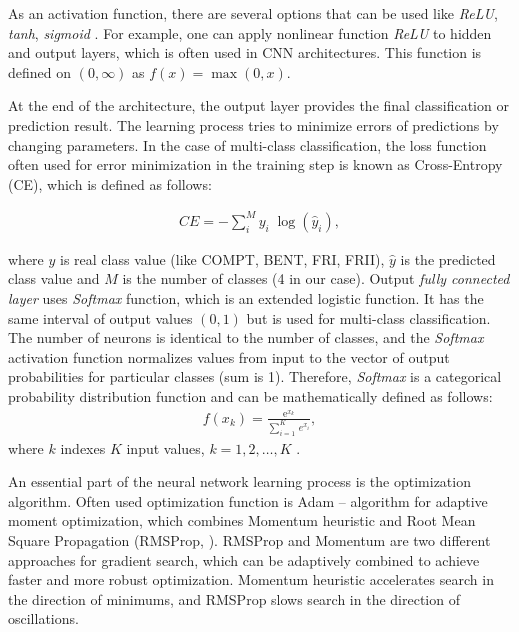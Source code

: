 \documentclass[fleqn,usenatbib]{mnras}
\begin{document}

As an activation function, there are several options that can be used like \textit{ReLU}, \textit{tanh}, \textit{sigmoid} \citep{Goodfellow-et-al-2016}. For example, one can apply nonlinear function \textit{ReLU} \citep{Nair2010} to hidden and output layers, which is often used in CNN architectures. This function is defined on $(0,\infty)$ as $f(x)=\max(0,x)$. 

At the end of the architecture, the output layer provides the final classification or prediction result. The learning process tries to minimize errors of predictions by changing parameters. In the case of multi-class classification, the loss function often used for error minimization in the training step is known as Cross-Entropy (CE), which is defined as follows:

    \begin{eqnarray}
       CE = -\sum_i^M y_i\;\log(\hat{y}_i),
    \end{eqnarray}
    
where $y$ is real class value (like COMPT, BENT, FRI, FRII), $\hat{y}$ is the predicted class value and $M$ is the number of classes (4 in our case). Output \textit{fully connected layer} uses \textit{Softmax} function, which is an extended logistic function. It has the same interval of output values $(0,1)$ but is used for multi-class classification. The number of neurons is identical to the number of classes, and the \textit{Softmax} activation function normalizes values from input to the vector of output probabilities for particular classes (sum is 1). Therefore, \textit{Softmax} is a categorical probability distribution function and can be mathematically defined as follows:
 \begin{eqnarray}
     f(x_k)= \frac{\mathrm{e}^{x_k}}{\sum_{i=1}^K\mathrm\,{e}^{x_i}},
 \end{eqnarray}
where $k$ indexes $K$ input values, $k=1,2,\dots, K$ \citep{Goodfellow-et-al-2016}.

An essential part of the neural network learning process is the optimization algorithm. Often used optimization function is Adam \citep{adam} – algorithm for adaptive moment optimization, which combines Momentum heuristic \citep{momentum} and Root Mean Square Propagation (RMSProp, \cite{hinton2012neural}). RMSProp and Momentum are two different approaches for gradient search, which can be adaptively combined to achieve faster and more robust optimization. Momentum heuristic accelerates search in the direction of minimums, and RMSProp slows search in the direction of oscillations.
\end{document}
